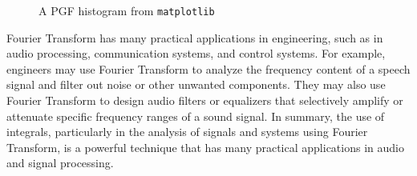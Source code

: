 \documentclass[13pt,a4paper]{report}
\begin{document}

\vspace{0.45cm}

\begin{figure}[ht!]
    \begin{center}
        
    \end{center}
    \caption{A PGF histogram from \texttt{matplotlib}}
\end{figure}

Fourier Transform has many practical applications in engineering, such as in audio processing, communication systems, and control systems. For example, engineers may use Fourier Transform to analyze the frequency content of a speech signal and filter out noise or other unwanted components. They may also use Fourier Transform to design audio filters or equalizers that selectively amplify or attenuate specific frequency ranges of a sound signal. In summary, the use of integrals, particularly in the analysis of signals and systems using Fourier Transform, is a powerful technique that has many practical applications in audio and signal processing.




\end{document}
